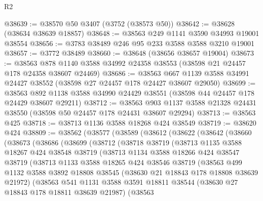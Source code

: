 \begin{lexlean}{R2}
\begin{coremodule}
@38639 := @38570 @50 @3407 (@3752 (@38573 @50))
@38642 := @38628 (@38634 @38639 @18857)
@38648 := @38563 @249 @1141 @3590 @34993 @19001 @38554
@38656 := @3783 @38489 @246 @95 @233 @3588 @3588 @3210 @19001
@38657 := @3772 @38489
@38660 := @38648 (@38656 @38657 @19004)
@38673 := @38563 @878 @1140 @3588 @34992 @24358 @38553 (@38598 @21 @24457 @178 @24358 @38607 @24469)
@38686 := @38563 @667 @1139 @3588 @34991 @24427 @38552 (@38598 @27 @24457 @178 @24427 @38607 @29050)
@38699 := @38563 @892 @1138 @3588 @34990 @24429 @38551 (@38598 @44 @24457 @178 @24429 @38607 @29211)
@38712 := @38563 @903 @1137 @3588 @21328 @24431 @38550 (@38598 @50 @24457 @178 @24431 @38607 @29294)
@38713 := @38563 @425
@38718 := @38713 @1136 @3588 @18268 @424 @38549
@38719 := @38620 @424
@38809 := @38562
    (@38577
      (@38589
        (@38612
          (@38622
            (@38642
              (@38660
                (@38673
                  (@38686
                    (@38699
                      (@38712
                        (@38718
                          @38719
                          (@38713
                            @1135
                            @3588
                            @18267
                            @424
                            @38548
                            @38719
                            (@38713
                              @1134
                              @3588
                              @18266
                              @424
                              @38547
                              @38719
                              (@38713
                                @1133
                                @3588
                                @18265
                                @424
                                @38546
                                @38719
                                (@38563
                                  @499
                                  @1132
                                  @3588
                                  @3892
                                  @18808
                                  @38545
                                  (@38630 @21 @18843 @178 @18808 @38639 @21972)
                                  (@38563
                                    @541
                                    @1131
                                    @3588
                                    @3591
                                    @18811
                                    @38544
                                    (@38630 @27 @18843 @178 @18811 @38639 @21987)
                                    (@38563

\end{coremodule}
\end{lexlean}
